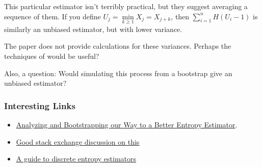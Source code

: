 This particular estimator isn't terribly practical,
but they suggest averaging a sequence of them.
If you define \(U_j = \min\limits_{k \geq 1} X_j = X_{j + k}\),
then \(\sum\limits_{i = 1}^n H(U_i - 1)\) is similarly an unbiased estimator,
but with lower variance.

The paper does not provide calculations for these variances.
Perhaps the techniques of \cite{DBLP:journals/dam/FlajoletGT92} would be useful?

Also, a question: Would simulating this process from a bootstrap give an unbiased estimator?

\subsubsection{Interesting Links}

\begin{itemize}
\item \href{http://thirdorderscientist.org/homoclinic-orbit/2013/7/23/analyzing-and-bootstrapping-our-way-to-a-better-entropy-estimator-mdash-part-ii-computational}{Analyzing and Bootstrapping our Way to a Better Entropy Estimator}.
\item \href{https://math.stackexchange.com/questions/604654/estimating-the-entropy}{Good stack exchange discussion on this}
\item \href{https://memming.wordpress.com/2014/02/09/a-guide-to-discrete-entropy-estimators/}{A guide to discrete entropy estimators}
\end{itemize}
